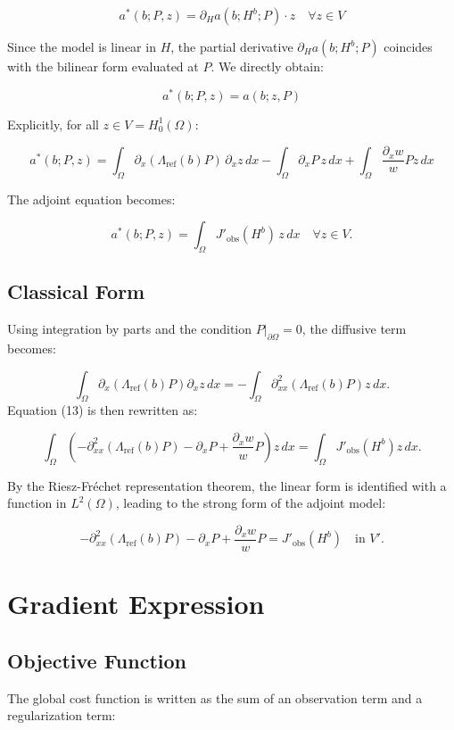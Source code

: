 \documentclass{article}
\begin{document}
\[
a^*(b; P, z) = \partial_H a(b; H^b; P) \cdot z \quad \forall z \in V
\]  

Since the model is linear in \( H \), the partial derivative \( \partial_H a(b; H^b; P) \) coincides with the bilinear form evaluated at \( P \). We directly obtain:

\[
a^*(b; P, z) = a(b; z, P)
\]  

Explicitly, for all \( z \in V = H^1_0(\Omega) \):

\[
a^*(b; P, z) = \int_\Omega \partial_x(\Lambda_{\text{ref}}(b) P) \, \partial_x z \, dx - \int_\Omega \partial_x P \, z \, dx + \int_\Omega \frac{\partial_x w}{w} P z \, dx \tag{14}
\]  

The adjoint equation becomes:

\[
a^*(b; P, z) = \int_\Omega J'_{\text{obs}}(H^b) \, z \, dx \quad \forall z \in V. \tag{13}
\]  

\subsection{Classical Form}

Using integration by parts and the condition \( P|_{\partial\Omega} = 0 \), the diffusive term becomes:

\[
\int_\Omega \partial_x\left(\Lambda_{\text{ref}}(b) P\right) \partial_x z \, dx = -\int_\Omega \partial_{xx}^2\left(\Lambda_{\text{ref}}(b) P\right) z \, dx. \tag{15}
\]  
Equation (13) is then rewritten as:

\[
\int_\Omega \left(-\partial_{xx}^2\left(\Lambda_{\text{ref}}(b) P\right) - \partial_x P + \frac{\partial_x w}{w} P \right) z \, dx = \int_\Omega J'_{\text{obs}}(H^b) z \, dx. \tag{16}
\]  

By the Riesz-Fréchet representation theorem, the linear form is identified with a function in \( L^2(\Omega) \), leading to the strong form of the adjoint model:

\[
-\partial_{xx}^2\left(\Lambda_{\text{ref}}(b) P\right) - \partial_x P + \frac{\partial_x w}{w} P = J'_{\text{obs}}(H^b) \quad \text{in } V'. \tag{17}
\]

\section{Gradient Expression}

\subsection{Objective Function}
The global cost function is written as the sum of an observation term and a regularization term:
\end{document}
